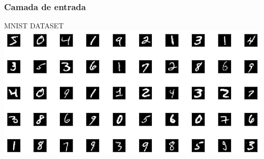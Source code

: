 \documentclass[tikz,11pt]{beamer}
\begin{document}
\begin{frame}
	\frametitle{Camada de entrada}
	\centering
	MNIST DATASET
	\includegraphics[width=.8\paperwidth]{images/fabio/inputs}
\end{frame}
\end{document}
